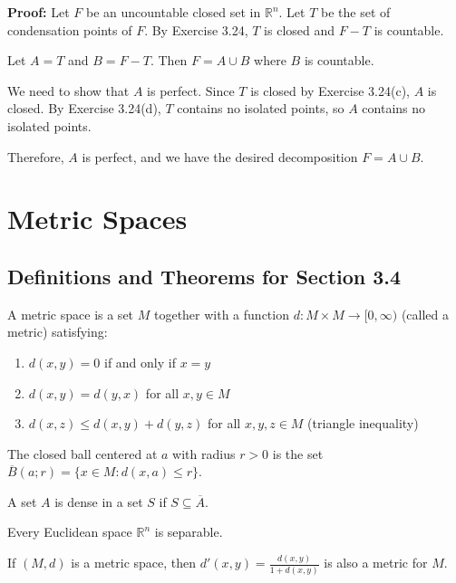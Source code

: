 \textbf{Proof:} Let $F$ be an uncountable closed set in $\mathbb{R}^n$. Let $T$ be the set of condensation points of $F$. By Exercise 3.24, $T$ is closed and $F - T$ is countable.

Let $A = T$ and $B = F - T$. Then $F = A \cup B$ where $B$ is countable.

We need to show that $A$ is perfect. Since $T$ is closed by Exercise 3.24(c), $A$ is closed. By Exercise 3.24(d), $T$ contains no isolated points, so $A$ contains no isolated points.

Therefore, $A$ is perfect, and we have the desired decomposition $F = A \cup B$.

\section{Metric Spaces}

\subsection*{Definitions and Theorems for Section 3.4}

\begin{definition}
A metric space is a set $M$ together with a function $d: M \times M \to [0,\infty)$ (called a metric) satisfying:
\begin{enumerate}
\item $d(x,y) = 0$ if and only if $x = y$
\item $d(x,y) = d(y,x)$ for all $x,y \in M$
\item $d(x,z) \leq d(x,y) + d(y,z)$ for all $x,y,z \in M$ (triangle inequality)
\end{enumerate}
\end{definition}

\begin{definition}
The closed ball centered at $a$ with radius $r > 0$ is the set $\overline{B}(a;r) = \{x \in M : d(x,a) \leq r\}$.
\end{definition}

\begin{definition}
A set $A$ is dense in a set $S$ if $S \subseteq \overline{A}$.
\end{definition}

\begin{theorem}
Every Euclidean space $\mathbb{R}^n$ is separable.
\end{theorem}

\begin{theorem}
If $(M,d)$ is a metric space, then $d'(x,y) = \frac{d(x,y)}{1 + d(x,y)}$ is also a metric for $M$.
\end{theorem}

